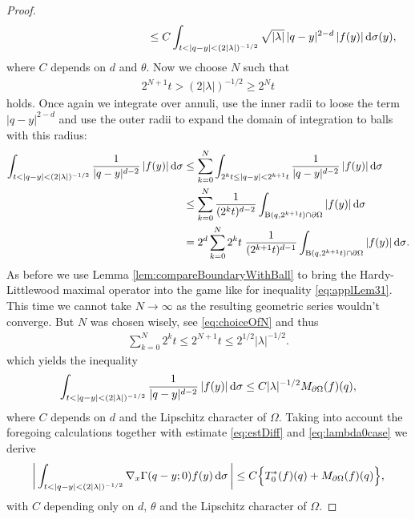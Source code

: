 \begin{proof}
\begin{align}
\begin{alignedat}{1}
       &\hspace{4cm}\leq C \int_{t < |q - y| < (2|\lambda|)^{-1/2}} \sqrt{|\lambda|} \, |q - y|^{2 - d}\, |f(y)| \d\sigma(y),
     \end{alignedat}
   \end{align}
   where $C$ depends on $d$ and $\theta$. 
   Now we choose $N$ such that 
   \begin{align}
     \label{eq:choiceOfN}
     2^{N + 1} t > (2|\lambda|)^{-1/2} \geq 2^N t
   \end{align}
   holds. 
   Once again we integrate over annuli, use the inner radii to loose the term $|q - y|^{2 - d}$ and use the outer radii to expand the domain of integration to balls with this radius:
   \begin{align*}\int_{t < |q - y| < (2|\lambda|)^{-1/2}} \frac{1}{|q - y|^{d - 2}} \, |f(y)| \, {\operatorname{d}\!{\sigma}}
     &\leq \sum_{k = 0}^N \int_{2^kt \leq |q - y| < 2^{k + 1} t} \frac{1}{|q - y|^{d - 2}}\, |f(y)| \, {\operatorname{d}\!{\sigma}} \\
     &\leq  \sum_{k = 0}^N \frac{1}{(2^{k}t)^{d - 2}}  \int_{\mathrm{B}(q, 2^{k + 1}t) \cap \partial\Omega} |f(y)| \, {\operatorname{d}\!{\sigma}} \\
     &=  2^d \sum_{k = 0}^N 2^k t \;  \frac{1}{(2^{k + 1}t)^{d - 1}}  \int_{\mathrm{B}(q, 2^{k + 1}t) \cap \partial\Omega} |f(y)| \, {\operatorname{d}\!{\sigma}}.
   \end{align*}
   As before we use Lemma \ref{lem:compareBoundaryWithBall} to bring the Hardy-Littlewood maximal operator into the game like for inequality \eqref{eq:applLem31}.
   This time we cannot take $N \to \infty$ as the resulting geometric series wouldn't converge. 
   But $N$ was chosen wisely, see \eqref{eq:choiceOfN} and thus
   \begin{align*}
     \sum_{k = 0}^N 2^k t \leq 2^{N + 1} t \leq 2^{1/2} |\lambda|^{-1/2}.
   \end{align*}
   which yields the inequality
   \begin{align*}\int_{t < |q - y| < (2|\lambda|)^{-1/2}} \frac{1}{|q - y|^{d - 2}} \, |f(y)| \, {\operatorname{d}\!{\sigma}}
     \leq C |\lambda|^{-1/2} M_{\partial\Omega}(f)(q),
   \end{align*}
   where $C$ depends on $d$ and the Lipschitz character of $\Omega$.
   Taking into account the foregoing calculations together with estimate \eqref{eq:estDiff} and \eqref{eq:lambda0case} we derive
   \begin{align}
     \label{eq:finalltt}
     \bigg| \int_{t < |q - y| < (2|\lambda|)^{-1/2}} \nabla_x\Gamma(q - y; 0) f(y)  \, {\operatorname{d}\!{\sigma}}\, \bigg| \leq C \Big\{ T_0^*(f)(q) + M_{\partial\Omega}(f)(q) \Big\},
   \end{align}
   with $C$ depending only on $d$, $\theta$ and the Lipschitz character of $\Omega$.


\end{proof}
